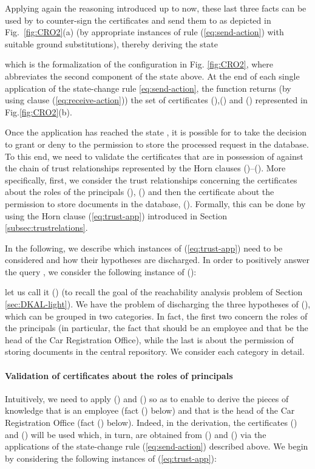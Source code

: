 \documentclass[conference]{llncs}
\begin{document}
{Applying again the reasoning introduced up to now, 
these last three facts can be used by  to counter-sign the
  certificates and send them to  as depicted in
  Fig.~\ref{fig:CRO2}(a) (by appropriate instances  of rule
  (\ref{eq:send-action}) with  suitable ground substitutions), thereby deriving the
  state
   
  which is the formalization of the configuration in Fig. \ref{fig:CRO2}, where  abbreviates the second component of the state  above. 
At the end of each single application of the state-change rule \eqref{eq:send-action}, the function 
returns (by using clause (\ref{eq:receive-action})) the set of certificates (),() and () represented in Fig.\ref{fig:CRO2}(b). 

 Once the application has reached the state , it is possible for  to
 take the decision to grant or deny to 
the permission to store the processed request in the database.
To this end, we need to validate the certificates that are in possession of
 against the chain of trust relationships represented by the Horn
clauses ()--(). More specifically, first, we consider the trust
relationships concerning the certificates about the roles of the
principals (), () and then the certificate about the permission to store
documents in the database, (). Formally, this can be done by using the Horn
clause (\ref{eq:trust-app}) introduced in Section \ref{subsec:trustrelations}.  

In the
following, we describe which instances of (\ref{eq:trust-app}) need to
be considered and how their hypotheses are discharged.
In order to positively answer the query , we consider the following
instance of (): 

let us call it () (to recall the goal of the reachability analysis problem of Section \ref{sec:DKAL-light}).  We have the problem of discharging the three hypotheses of (), which can be grouped in two categories.  In fact,
the first two concern the roles of the principals (in particular, the
fact that  should be an employee and that  be the head of
the Car Registration Office), while the last is about the permission of
storing documents in the central repository.  We consider each
category in detail.  \\


\paragraph{Validation of certificates about the roles of principals}

Intuitively, we need to apply () and () so as to enable  to
derive the pieces of knowledge that  is an employee (fact ()
below) and that  is the head of the Car Registration Office
(fact () below). Indeed, in the derivation, the certificates () and
() will be used which, in turn, are obtained from () and () via
the applications of the state-change rule (\ref{eq:send-action})
described above. We begin by considering the following instances of
(\ref{eq:trust-app}):

}
\end{document}
